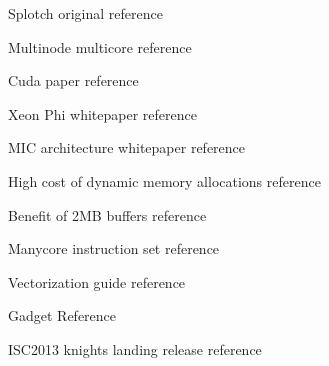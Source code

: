 \documentclass[runningheads,a4paper]{llncs}
\begin{document}


\begin{thebibliography}{4}

 Splotch original reference

 Multinode multicore reference

 Cuda paper reference

 Xeon Phi whitepaper reference

 MIC architecture whitepaper reference 

 High cost of dynamic memory allocations reference

 Benefit of 2MB buffers reference 

 Manycore instruction set reference

 Vectorization guide reference

 Gadget Reference

 ISC2013 knights landing release reference








\end{thebibliography}

%
\end{document}
